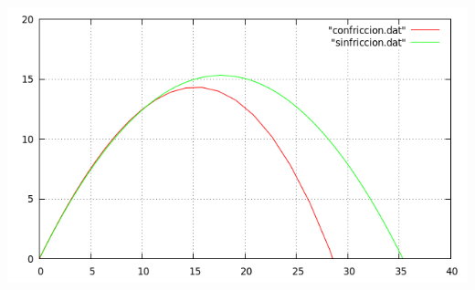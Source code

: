 \documentclass[12pt]{article}
\begin{document}
\begin{center}
\includegraphics[width=17cm]{graf.png}\\
\end{center}
\end{document}

